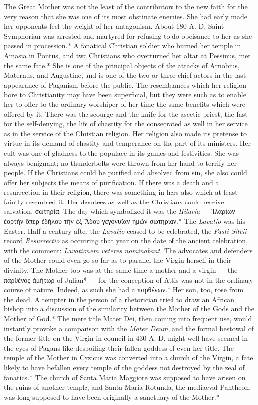 \documentclass[a4paper, 11pt, oneside, polutonikogreek, english]{article}
\begin{document}
The Great Mother was not the least of the contributors to the new faith for the very reason that she was one of its most obstinate enemies. She had early made her opponents feel the weight of her antagonism. About 180 A. D. Saint Symphorian was arrested and martyred for refusing to do obeisance to her as she passed in procession.* A fanatical Christian soldier who burned her temple in Amasia in Pontus, and two Christians who overturned her altar at Pessinus, met the same fate.* She is one of the principal objects of the attacks of Arnobius, Maternus, and Augustine, and is one of the two or three chief actors in the last appearance of Paganism before the public. The resemblances which her religion bore to Christianity may have been superficial, but they were such as to enable her to offer to the ordinary worshiper of her time the same benefits which were offered by it. There was the scourge and the knife for the ascetic priest, the fast for the self-denying, the life of chastity for the consecrated as well in her service as in the service of the Christian religion. Her religion also made its pretense to virtue in its demand of chastity and temperance on the part of its ministers. Her cult was one of gladness to the populace in its games and festivities. She was always benignant; no thunderbolts were thrown from her hand to terrify her people. If the Christians could be purified and absolved from sin, she also could offer her subjects the means of purification. If there was a death and a resurrection in their religion, there was something in hers also which at least faintly resembled it. Her devotees as well as the Christians could receive salvation, σωτηρία. The day which symbolized it was the \emph{Hilaria} --- Ἱλαρίων ἑορτὴν ὅπερ ἐδήλου τὴν ἐξ Ἄδου γεγονυῖαν ἡμῶν σωτηρίαν.* The \emph{Lavatio} was his Easter. Half a century after the \emph{Lavatio} ceased to be celebrated, the \emph{Fasti Silvii} record \emph{Resurrectio} as occurring that year on the date of the ancient celebration, with the comment: \emph{Lavationem veteres nominabant}. The advocates and defenders of the Mother could even go so far as to parallel the Virgin herself in their divinity. The Mother too was at the same time a mother and a virgin --- the παρθένος ἀμήτωρ of Julian* --- for the conception of Attis was not in the ordinary course of nature. Indeed, as such she had a παρθένων.* Her son, too, rose from the dead. A tempter in the person of a rhetorician tried to draw an African bishop into a discussion of the similarity between the Mother of the Gods and the Mother of God.* The mere title Mater Dei, then coming into frequent use, would instantly provoke a comparison with the \emph{Mater Deum}, and the formal bestowal of the former title on the Virgin in council in 430 A. D. might well have seemed in the eyes of Pagans like despoiling their fallen goddess of even her title. The temple of the Mother in Cyzicus was converted into a church of the Virgin, a fate likely to have befallen every temple of the goddess not destroyed by the zeal of fanatics.* The church of Santa Maria Maggiore was supposed to have arisen on the ruins of another temple, and Santa Maria Rotunda, the mediaeval Pantheon, was long supposed to have been originally a sanctuary of the Mother.*
\end{document}
